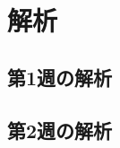 \documentclass[dvipdfmx]{jreport}
\begin{document}
\chapter{解析}

\section{第1週の解析}

\section{第2週の解析}
\end{document}
